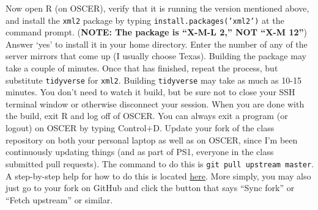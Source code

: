 \documentclass[12pt,english]{exam}
\begin{document}
\begin{questions}
\question Now open R (on OSCER), verify that it is running the version mentioned above, and install the \texttt{xml2} package by typing \texttt{install.packages('xml2')} at the command prompt. (\textbf{NOTE: The package is ``X-M-L 2,'' NOT ``X-M 12''}) Answer `yes' to install it in your home directory. Enter the number of any of the server mirrors that come up (I usually choose Texas). Building the package may take a couple of minutes. Once that has finished, repeat the process, but substitute \texttt{tidyverse} for \texttt{xml2}. Building \texttt{tidyverse} may take as much as 10-15 minutes. You don't need to watch it build, but be sure not to close your SSH terminal window or otherwise disconnect your session. When you are done with the build, exit R and log off of OSCER. You can always exit a program (or logout) on OSCER by typing Control+D.
\question Update your fork of the class repository on both your personal laptop as well as on OSCER, since I'm been continuously updating things (and as part of PS1, everyone in the class submitted pull requests). The command to do this is \texttt{git pull upstream master}. A step-by-step help for how to do this is located \href{https://help.github.com/articles/syncing-a-fork/}{here}. More simply, you may also just go to your fork on GitHub and click the button that says ``Sync fork'' or ``Fetch upstream'' or similar.
\end{questions}
\end{document}
